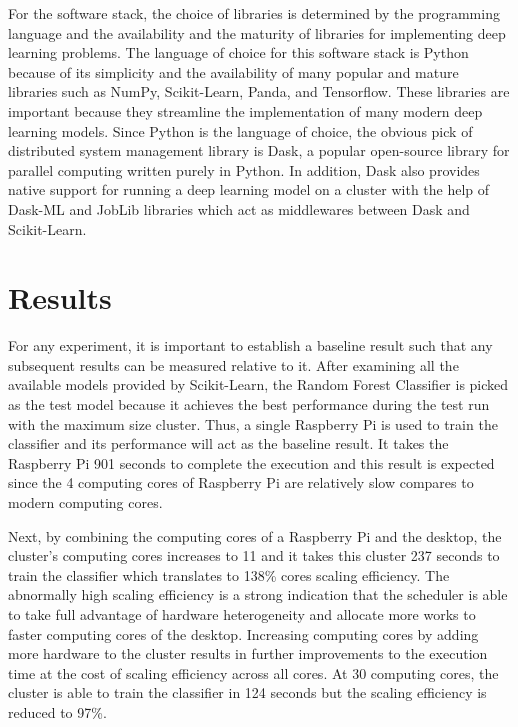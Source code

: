\documentclass[conference]{IEEEtran}
\begin{document}
        For the software stack, the choice of libraries is determined by the programming language and the availability and the maturity of libraries for implementing deep learning problems. The language of choice for this software stack is Python because of its simplicity and the availability of many popular and mature libraries such as NumPy, Scikit-Learn, Panda, and Tensorflow. These libraries are important because they streamline the implementation of many modern deep learning models. Since Python is the language of choice, the obvious pick of distributed system management library is Dask, a popular open-source library for parallel computing written purely in Python. In addition, Dask also provides native support for running a deep learning model on a cluster with the help of Dask-ML and JobLib libraries which act as middlewares between Dask and Scikit-Learn. 

    \section{Results}   
        For any experiment, it is important to establish a baseline result such that any subsequent results can be measured relative to it. After examining all the available models provided by Scikit-Learn, the Random Forest Classifier is picked as the test model because it achieves the best performance during the test run with the maximum size cluster. Thus, a single Raspberry Pi is used to train the classifier and its performance will act as the baseline result. It takes the Raspberry Pi 901 seconds to complete the execution and this result is expected since the 4 computing cores of Raspberry Pi are relatively slow compares to modern computing cores. 
            
        Next, by combining the computing cores of a Raspberry Pi and the desktop, the cluster's computing cores increases to 11 and it takes this cluster 237 seconds to train the classifier which translates to 138\% cores scaling efficiency. The abnormally high scaling efficiency is a strong indication that the scheduler is able to take full advantage of hardware heterogeneity and allocate more works to faster computing cores of the desktop. Increasing computing cores by adding more hardware to the cluster results in further improvements to the execution time at the cost of scaling efficiency across all cores. At 30 computing cores, the cluster is able to train the classifier in 124 seconds but the scaling efficiency is reduced to 97\%. 
        
\end{document}
